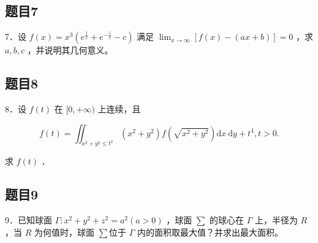 \documentclass{article}
\begin{document}
\subsection{题目7}
7．设 \(f(x)=x^{3}\left(e^{\frac{1}{x}}+e^{-\frac{1}{x}}-c\right)\) 满足 \(\lim _{x \rightarrow \infty}[f(x)-(a x+b)]=0\) ，求 \(a, b, c\) ，并说明其几何意义。

\subsection{题目8}
8．设 \(f(t)\) 在 \([0,+\infty)\) 上连续，且

\[
f(t)=\iint_{x^{2}+y^{2} \leq t^{2}}\left(x^{2}+y^{2}\right) f\left(\sqrt{x^{2}+y^{2}}\right) \mathrm{d} x \mathrm{~d} y+t^{4}, t>0 .
\]

求 \(f(t)\) ．

\subsection{题目9}
9．已知球面 \(\Gamma: x^{2}+y^{2}+z^{2}=a^{2}(a>0)\) ，球面 \(\sum\) 的球心在 \(\Gamma\) 上，半径为 \(R\) ，当 \(R\) 为何值时，球面 \(\sum\)位于 \(\Gamma\) 内的面积取最大值？并求出最大面积。
\end{document}

